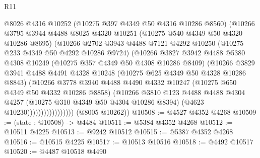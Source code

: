 \begin{lexlean}{R11}
\begin{coremodule}
                          @8026
                          @4316
                          @10252
                          (@10275 @397 @4349 @50 @4316 @10286 @8560)
                          (@10266
                            @3795
                            @3944
                            @4488
                            @8025
                            @4320
                            @10251
                            (@10275 @540 @4349 @50 @4320 @10286 @8695)
                            (@10266
                              @2702
                              @3943
                              @4488
                              @7121
                              @4292
                              @10250
                              (@10275 @233 @4349 @50 @4292 @10286 @9724)
                              (@10266
                                @3827
                                @3942
                                @4488
                                @5380
                                @4308
                                @10249
                                (@10275 @357 @4349 @50 @4308 @10286 @8409)
                                (@10266
                                  @3829
                                  @3941
                                  @4488
                                  @4491
                                  @4328
                                  @10248
                                  (@10275 @625 @4349 @50 @4328 @10286 @8843)
                                  (@10266
                                    @3778
                                    @3940
                                    @4488
                                    @4490
                                    @4332
                                    @10247
                                    (@10275 @650 @4349 @50 @4332 @10286 @8858)
                                    (@10266
                                      @3810
                                      @123
                                      @4488
                                      @4488
                                      @4304
                                      @4257
                                      (@10275 @310 @4349 @50 @4304 @10286 @8394)
                                      (@4623 @10230)))))))))))))))))
      (@8005 @10262))
@10508 := @4527 @4352 @4268
@10509 := (state : @10508) -> @4484
@10511 := @5384 @4352 @4268
@10512 := @10511 @4225
@10513 := @9242 @10512
@10515 := @5387 @4352 @4268
@10516 := @10515 @4225
@10517 := @10513 @10516
@10518 := @4492 @10517
@10520 := @4487 @10518 @4490

\end{coremodule}
\end{lexlean}
